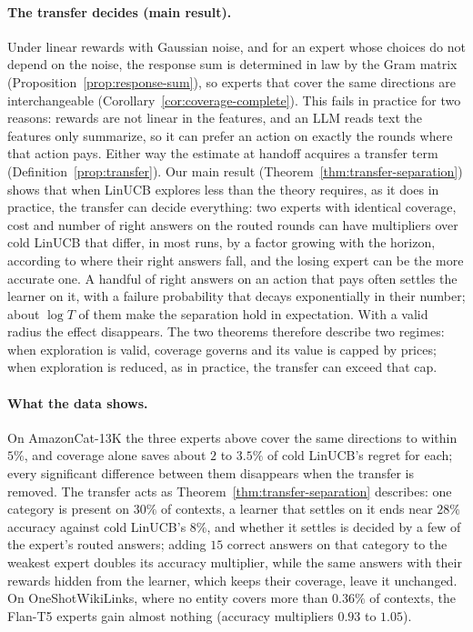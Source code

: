 \documentclass[anon]{alt2027} %
\begin{document}
\paragraph{The transfer decides (main result).}
Under linear rewards with Gaussian noise, and for an expert whose choices do
not depend on the noise, the response sum is determined in law by the Gram
matrix (Proposition~\ref{prop:response-sum}), so experts that cover the same
directions are interchangeable (Corollary~\ref{cor:coverage-complete}). This
fails in practice for two reasons: rewards are not linear in the features,
and an LLM reads text the features only summarize, so it can prefer an action
on exactly the rounds where that action pays. Either way the estimate at
handoff acquires a transfer term (Definition~\ref{prop:transfer}). Our main
result (Theorem~\ref{thm:transfer-separation}) shows that when LinUCB explores
less than the theory requires, as it does in practice, the transfer can
decide everything: two experts with identical coverage, cost and number of
right answers on the routed rounds can have multipliers over cold LinUCB that
differ, in most runs, by a factor growing with the horizon, according to
where their right answers fall, and the losing expert can be the more
accurate one. A handful of right answers on an action that pays often settles
the learner on it, with a failure probability that decays exponentially in
their number; about $\log T$ of them make the separation hold in expectation.
With a valid radius the effect disappears. The two theorems therefore
describe two regimes: when exploration is valid, coverage governs and its
value is capped by prices; when exploration is reduced, as in practice, the
transfer can exceed that cap.

\paragraph{What the data shows.}
On AmazonCat-13K the three experts above cover the same directions to within
$5\%$, and coverage alone saves about $2$ to $3.5\%$ of cold LinUCB's regret
for each; every significant difference between them disappears when the
transfer is removed. The transfer acts as Theorem~\ref{thm:transfer-separation}
describes: one category is present on $30\%$ of contexts, a learner that
settles on it ends near $28\%$ accuracy against cold LinUCB's $8\%$, and
whether it settles is decided by a few of the expert's routed answers; adding
$15$ correct answers on that category to the weakest expert doubles its
accuracy multiplier, while the same answers with their rewards hidden from the
learner, which keeps their coverage, leave it unchanged. On OneShotWikiLinks, where no entity covers more than
$0.36\%$ of contexts, the Flan-T5 experts gain almost nothing (accuracy
multipliers $0.93$ to $1.05$).
\end{document}
